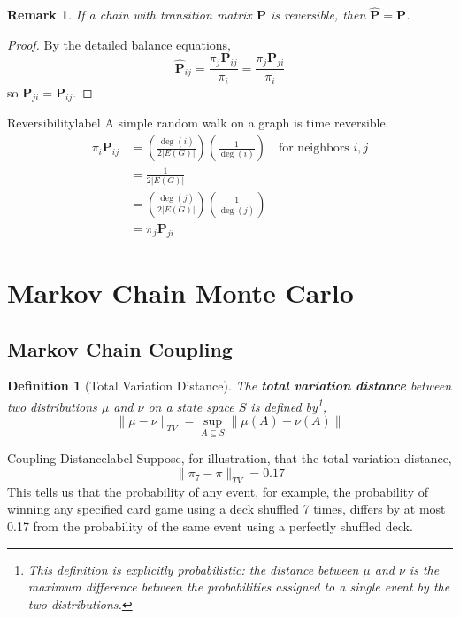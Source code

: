 \documentclass{tufte-handout}
\newtheorem{defn}[thm]{Definition}
\newtheorem{rmk}[thm]{Remark}
\begin{document}
  \begin{rmk}
    If a chain with transition matrix $\boldsymbol{P}$ is reversible, then $\hat{\boldsymbol{P}} = \boldsymbol{P}$.
  \end{rmk}

  \begin{proof}
    By the detailed balance equations,
    \[\hat{\boldsymbol{P}}_{ij} = \frac{\pi_j\boldsymbol{P}_{ij}}{\pi_i} = \frac{\pi_j\boldsymbol{P}_{ji}}{\pi_i}\]
    \noindent so $\boldsymbol{P}_{ji} = \boldsymbol{P}_{ij}$.
  \end{proof}

  \begin{ex}{Reversibility}{label}
    A simple random walk on a graph is time reversible.
    \begin{align*}
      \pi_{i} \boldsymbol{P}_{i j} &=\left(\frac{\operatorname{deg}(i)}{2 |E(G)|}\right)\left(\frac{1}{\operatorname{deg}(i)}\right) \quad \text{for neighbors $i,j$}\\
      &=\frac{1}{2 |E(G)|}\\
      &=\left(\frac{\operatorname{deg}(j)}{2 |E(G)|}\right)\left(\frac{1}{\operatorname{deg}(j)}\right)\\
      &=\pi_{j} \boldsymbol{P}_{j i}
    \end{align*}
  \end{ex}

  \section{Markov Chain Monte Carlo}
  \subsection{Markov Chain Coupling}
  \begin{defn}[Total Variation Distance]
    The \textbf{total variation distance} between two distributions $\mu$ and $\nu$ on a state space $S$ is defined by\footnote{This definition is explicitly probabilistic: the distance between $\mu$ and $\nu$ is the maximum difference between the probabilities assigned to a single event by the two distributions.},
    \[\|\mu - \nu\|_{TV} = \sup_{A \subseteq S}\|\mu(A) - \nu(A)\|\] 
  \end{defn}

  \begin{ex}{Coupling Distance}{label}
    Suppose, for illustration, that the total variation distance,
    \[\|\pi_7 - \pi\|_{TV} = 0.17\]
    This tells us that the probability of any event, for example, the probability of winning any specified card game using a deck shuffled 7 times, differs by at most 0.17 from the probability of the same event using a perfectly shuffled deck.
  \end{ex}
\end{document}
